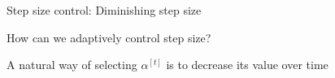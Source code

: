 \documentclass[11pt,compress,t,notes=noshow, xcolor=table]{beamer}
\begin{document}
	
	\begin{vbframe}{Step size control: Diminishing step size}

    	How can we adaptively control step size?

        \medskip
    
        A natural way of selecting $\alpha^{[t]}$ is to decrease its value over time

        \medskip
    	
    

\end{vbframe}
\end{document}
